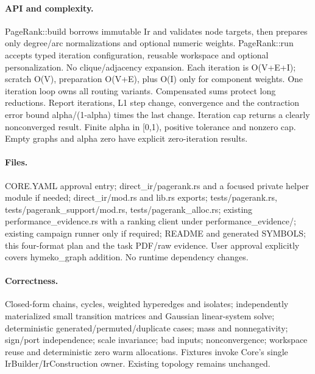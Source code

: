 \documentclass[11pt]{article}
\begin{document}
\paragraph{API and complexity.} PageRank::build borrows immutable Ir and validates
node targets, then prepares only degree/arc normalizations and optional numeric
weights. PageRank::run accepts typed iteration configuration, reusable workspace
and optional personalization. No clique/adjacency expansion. Each iteration is
O(V+E+I); scratch O(V), preparation O(V+E), plus O(I) only for component weights.
One iteration loop owns all routing variants. Compensated sums protect long
reductions. Report iterations, L1 step change, convergence and the contraction
error bound alpha/(1-alpha) times the last change. Iteration cap returns a clearly
nonconverged result. Finite alpha in [0,1), positive tolerance and nonzero cap.
Empty graphs and alpha zero have explicit zero-iteration results.

\paragraph{Files.} CORE.YAML approval entry; direct\_ir/pagerank.rs and a focused
private helper module if needed; direct\_ir/mod.rs and lib.rs exports; tests/pagerank.rs,
tests/pagerank\_support/mod.rs, tests/pagerank\_alloc.rs; existing
performance\_evidence.rs with a ranking client under performance\_evidence/;
existing campaign runner only if required; README and generated SYMBOLS; this
four-format plan and the task PDF/raw evidence. User approval explicitly covers
hymeko\_graph addition. No runtime dependency changes.

\paragraph{Correctness.} Closed-form chains, cycles, weighted hyperedges and
isolates; independently materialized small transition matrices and Gaussian
linear-system solve; deterministic generated/permuted/duplicate cases; mass and
nonnegativity; sign/port independence; scale invariance; bad inputs; nonconvergence;
workspace reuse and deterministic zero warm allocations. Fixtures invoke Core's
single IrBuilder/IrConstruction owner. Existing topology remains unchanged.
\end{document}
